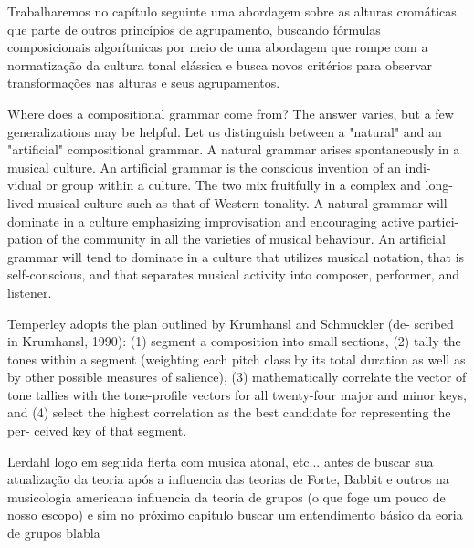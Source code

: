 \documentclass[
	12pt,				%
	openright,			%
	twoside,			%
	a4paper,			%
	english,			%
	french,				%
	spanish,			%
	brazil				%
	]{abntex2}
\begin{document}
Trabalharemos no capítulo seguinte uma abordagem sobre as alturas cromáticas que parte de outros princípios de agrupamento, buscando fórmulas composicionais algorítmicas por meio de uma abordagem que rompe com a normatização  da cultura tonal clássica e busca novos critérios para observar transformações nas alturas e seus agrupamentos.

\begin{citacao}
Where does a compositional grammar come from? The answer varies, but a few
generalizations may be helpful. Let us distinguish between a "natural" and an
"artificial" compositional grammar. A natural grammar arises spontaneously in
a musical culture. An artificial grammar is the conscious invention of an indi-
vidual or group within a culture. The two mix fruitfully in a complex and long-
lived musical culture such as that of Western tonality. A natural grammar will
dominate in a culture emphasizing improvisation and encouraging active partici-
pation of the community in all the varieties of musical behaviour. An artificial
grammar will tend to dominate in a culture that utilizes musical notation, that is
self-conscious, and that separates musical activity into composer, performer,
and listener.
\cite[p. 100-101]{lerdahl1992cognitive}
\end{citacao}








Temperley adopts the plan outlined by Krumhansl and Schmuckler (de- 
scribed in Krumhansl, 1990): (1) segment a composition into small sections, (2) tally 
the tones within a segment (weighting each pitch class by its total duration as well 
as by other possible measures of salience), (3) mathematically correlate the vector 
of tone tallies with the tone-profile vectors for all twenty-four major and minor keys, 
and (4) select the highest correlation as the best candidate for representing the per- 
ceived key of that segment. 



Lerdahl logo em seguida flerta com musica atonal, etc... \cite{lerdahl1992cognitive} antes de buscar sua atualização da teoria após a influencia das teorias de Forte, Babbit e outros na musicologia americana influencia da teoria de grupos (o que foge um pouco de nosso escopo)  e sim no próximo capitulo buscar um entendimento básico da eoria de grupos blabla
\end{document}
